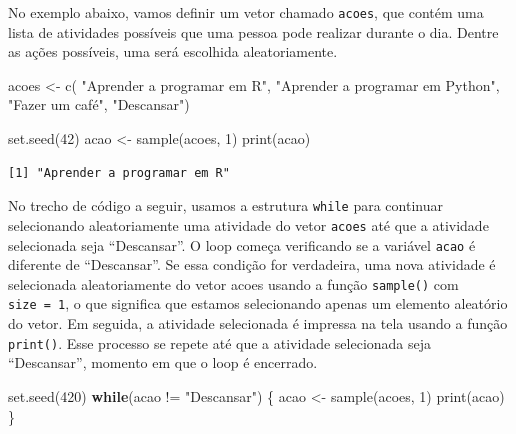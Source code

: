 \documentclass[
  portuguese,
  letterpaper,
  DIV=11,
  numbers=noendperiod]{scrreprt}
\newenvironment{Shaded}{\begin{snugshade}}{\end{snugshade}}
\newcommand{\ControlFlowTok}[1]{\textcolor[rgb]{0.00,0.23,0.31}{\textbf{#1}}}
\newcommand{\DecValTok}[1]{\textcolor[rgb]{0.68,0.00,0.00}{#1}}
\newcommand{\FunctionTok}[1]{\textcolor[rgb]{0.28,0.35,0.67}{#1}}
\newcommand{\NormalTok}[1]{\textcolor[rgb]{0.00,0.23,0.31}{#1}}
\newcommand{\OtherTok}[1]{\textcolor[rgb]{0.00,0.23,0.31}{#1}}
\newcommand{\SpecialCharTok}[1]{\textcolor[rgb]{0.37,0.37,0.37}{#1}}
\newcommand{\StringTok}[1]{\textcolor[rgb]{0.13,0.47,0.30}{#1}}
\theoremstyle{definition}
\theoremstyle{remark}
\begin{document}
No exemplo abaixo, vamos definir um vetor chamado \texttt{acoes}, que
contém uma lista de atividades possíveis que uma pessoa pode realizar
durante o dia. Dentre as ações possíveis, uma será escolhida
aleatoriamente.

\begin{Shaded}
\begin{Highlighting}[]
\NormalTok{acoes }\OtherTok{\textless{}{-}} \FunctionTok{c}\NormalTok{( }\StringTok{"Aprender a programar em R"}\NormalTok{,}
        \StringTok{"Aprender a programar em Python"}\NormalTok{,}
        \StringTok{"Fazer um café"}\NormalTok{,}
        \StringTok{"Descansar"}\NormalTok{)}

\FunctionTok{set.seed}\NormalTok{(}\DecValTok{42}\NormalTok{)}
\NormalTok{acao }\OtherTok{\textless{}{-}} \FunctionTok{sample}\NormalTok{(acoes, }\DecValTok{1}\NormalTok{)}
\FunctionTok{print}\NormalTok{(acao)}
\end{Highlighting}
\end{Shaded}

\begin{verbatim}
[1] "Aprender a programar em R"
\end{verbatim}

No trecho de código a seguir, usamos a estrutura \texttt{while} para
continuar selecionando aleatoriamente uma atividade do vetor
\texttt{acoes} até que a atividade selecionada seja ``Descansar''. O
loop começa verificando se a variável \texttt{acao} é diferente de
``Descansar''. Se essa condição for verdadeira, uma nova atividade é
selecionada aleatoriamente do vetor acoes usando a função
\texttt{sample()} com \texttt{size\ =\ 1}, o que significa que estamos
selecionando apenas um elemento aleatório do vetor. Em seguida, a
atividade selecionada é impressa na tela usando a função
\texttt{print()}. Esse processo se repete até que a atividade
selecionada seja ``Descansar'', momento em que o loop é encerrado.

\begin{Shaded}
\begin{Highlighting}[]
\FunctionTok{set.seed}\NormalTok{(}\DecValTok{420}\NormalTok{)}
\ControlFlowTok{while}\NormalTok{(acao }\SpecialCharTok{!=} \StringTok{"Descansar"}\NormalTok{) \{}
\NormalTok{  acao }\OtherTok{\textless{}{-}} \FunctionTok{sample}\NormalTok{(acoes, }\DecValTok{1}\NormalTok{)}
  \FunctionTok{print}\NormalTok{(acao)}
\NormalTok{\}}
\end{Highlighting}
\end{Shaded}
\end{document}
